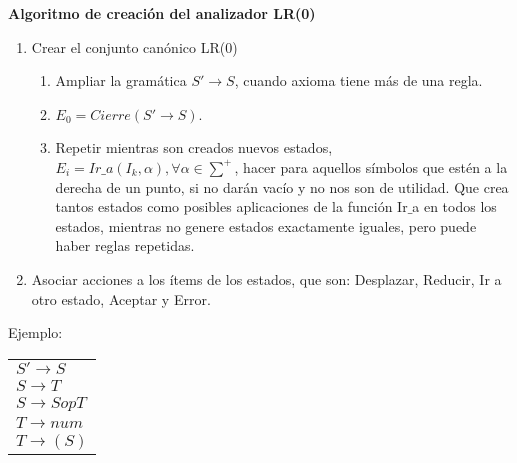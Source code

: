 \documentclass[12pt, twoside, openright]{report} %
\begin{document}
\textbf{Algoritmo de creación del analizador LR(0)}
\begin{enumerate}
	\item Crear el conjunto canónico LR(0)
	      \begin{enumerate}
		      \item Ampliar la gramática $S'\rightarrow S$, cuando axioma tiene más de una regla.
		      \item $E_0 = Cierre(S'\rightarrow S)$.
		      \item Repetir mientras son creados nuevos estados, $E_i = Ir\_a(I_k, \alpha), \forall \alpha \in \sum^+$, hacer para aquellos símbolos que estén a la derecha de un punto, si no darán vacío y no nos son de utilidad. Que crea tantos estados como posibles aplicaciones de la función Ir$\_$a en todos los estados, mientras no genere estados exactamente iguales, pero puede haber reglas repetidas.
	      \end{enumerate}
	\item Asociar acciones a los ítems de los estados, que son: Desplazar, Reducir, Ir a otro estado, Aceptar y Error.
\end{enumerate}

Ejemplo:
\begin{table}[H]
	\centering
	\begin{tabular}{l}
		$S' \rightarrow S$              \\
		$S \rightarrow T$               \\
		$S \rightarrow S \textit{op} T$ \\
		$T \rightarrow \textit{num}$    \\
		$T \rightarrow ( S )$
	\end{tabular}
\end{table}
\end{document}

